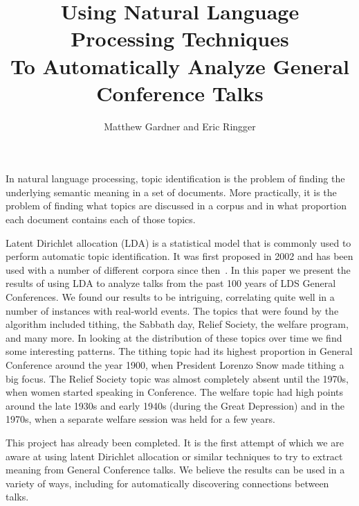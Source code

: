 \documentclass[onecolumn, 12pt]{article}
\title{Using Natural Language Processing Techniques\\To Automatically Analyze
General Conference Talks}
\author{Matthew Gardner and Eric Ringger}
\date{}
\begin{document}
\maketitle

In natural language processing, topic identification is the problem of finding
the underlying semantic meaning in a set of documents.  More practically, it is
the problem of finding what topics are discussed in a corpus and in what
proportion each document contains each of those topics.  

Latent Dirichlet allocation (LDA) is a statistical model that is commonly used
to perform automatic topic identification.  It was first proposed in 2002 and
has been used with a number of different corpora since then~\cite{blei-jmlr03}.
In this paper we present the results of using LDA to analyze talks from the
past 100 years of LDS General Conferences.  We found our results to be
intriguing, correlating quite well in a number of instances with real-world
events.  The topics that were found by the algorithm included tithing, the
Sabbath day, Relief Society, the welfare program, and many more.  In looking at
the distribution of these topics over time we find some interesting patterns.
The tithing topic had its highest proportion in General Conference around the
year 1900, when President Lorenzo Snow made tithing a big focus.  The Relief
Society topic was almost completely absent until the 1970s, when women started
speaking in Conference.  The welfare topic had high points around the late
1930s and early 1940s (during the Great Depression) and in the 1970s, when a
separate welfare session was held for a few years.

This project has already been completed.  It is the first attempt of which we
are aware at using latent Dirichlet allocation or similar techniques to try to
extract meaning from General Conference talks.  We believe the results can be
used in a variety of ways, including for automatically discovering connections
between talks.



\end{document}
